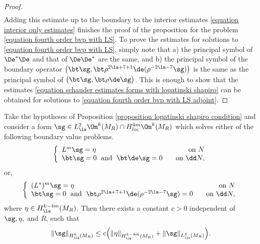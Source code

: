 \documentclass[hidelinks, 12pt, oneside, reqno]{amsart}
\begin{document}
\begin{proof}
\begin{align*}
    \end{align*}
    Adding this estimate up to the boundary to the interior estimates \eqref{equation interior only estimates} finishes the proof of the proposition for the problem \eqref{equation fourth order bvp with LS}. To prove the estimates for solutions to \eqref{equation fourth order bvp with LS}, simply note that a) the principal symbol of $\De^*\De$ and that of $\De \De^*$ are the same, and b) the principal symbol of the boundary operator $\big(\bt \sg, \bt \rho^{2\la + 7 + 1} \de (\rho^{-2\la -7} \sg) \big)$ is the same as the principal symbol of $\big(\bt \sg, \bt \rho \de \sg \big)$. This is enough to show that the estimates \eqref{equation schauder estimates forms with lopatinski shapiro} can be obtained for solutions to \eqref{equation fourth order bvp with LS adjoint}.
\end{proof}

\begin{cor}\label{corollary lopatinski shapiro higher order}
Take the hypotheses of Proposition \ref{proposition lopatinski shapiro condition} and consider a form $\sg \in L^2_{\la}\Om^k(M_R) \cap H^{4m}_{loc} \Om^k(M_R)$ which solves either of the following boundary value problems.
\begin{equation}\label{equation higher order arb elliptic bvp with LS}
    \left\{
\begin{array}{lr}
L^m\sg = \eta   & \;\; \text{ on } N\\ 
\bt \sg = 0 \;\text{ and }\; \bt \de \sg = 0 & \;\; \text{ on } \dd N,
\end{array}
\right.
\end{equation}
or,
\begin{equation}\label{equation higher order arb elliptic bvp with LS adjoint}
    \left\{
\begin{array}{lr}
(L^*)^m\sg = \eta   & \;\; \text{ on } N\\ 
\bt \sg = 0 \;\text{ and }\; \bt \rho^{2\la + 7 + 1} \de (\rho^{-2\la -7} \sg) = 0 & \;\; \text{ on } \dd N,
\end{array}
\right.
\end{equation}
where $\eta \in H_{\la}^{k-4m}(M_R)$. Then there exists a constant $c >0$ independent of $\sg, \eta,$ and $R$, such that
    \begin{equation}\label{equation high order elliptic schauder estimates on forms}
        \|\sg\|_{H^{k}_{\la}(M_R)} \le c\Big(\|\eta\|_{H^{k-4m}_{\la}(M_R)} + \|\sg\|_{L^2_{\la}(M_R)} \Big).
    \end{equation}
\end{cor}
\end{document}
